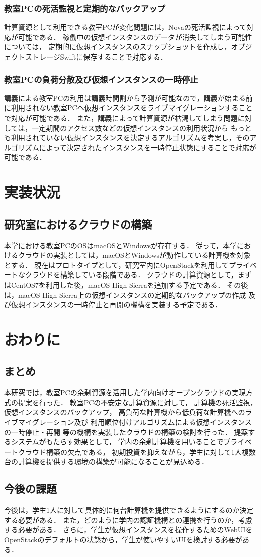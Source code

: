 \documentclass[10pt,a4paper]{jsarticle}
\begin{document}
\subsubsection{教室PCの死活監視と定期的なバックアップ}
計算資源として利用できる教室PCが変化問題には，Novaの死活監視によって対応が可能である．
稼働中の仮想インスタンスのデータが消失してしまう可能性については，
定期的に仮想インスタンスのスナップショットを作成し，オブジェクトストレージSwiftに保存することで対応する．
\subsubsection{教室PCの負荷分散及び仮想インスタンスの一時停止}
講義による教室PCの利用は講義時間割から予測が可能なので，講義が始まる前に利用されない教室PCへ仮想インスタンスをライブマイグレーションすることで対応が可能である．
また，講義によって計算資源が枯渇してしまう問題に対しては，一定期間のアクセス数などの仮想インスタンスの利用状況から
もっとも利用されていない仮想インスタンスを決定するアルゴリズムを考案し，そのアルゴリズムによって決定されたインスタンスを一時停止状態にすることで対応が可能である．

\section{実装状況}
\subsection{研究室におけるクラウドの構築}
本学における教室PCのOSはmacOSとWindowsが存在する．
従って，本学におけるクラウドの実装としては，macOSとWindowsが動作している計算機を対象とする．
現在はプロトタイプとして，研究室内にOpenStackを利用してプライベートなクラウドを構築している段階である．
クラウドの計算資源として，まずはCentOS7を利用した後，macOS High Sierraを追加する予定である．
その後は，macOS High Sierra上の仮想インスタンスの定期的なバックアップの作成
及び仮想インスタンスの一時停止と再開の機構を実装する予定である．

\section{おわりに}
\subsection{まとめ}
本研究では，教室PCの余剰資源を活用した学内向けオープンクラウドの実現方式の提案を行った．
教室PCの不安定な計算資源に対して，
計算機の死活監視，仮想インスタンスのバックアップ，
高負荷な計算機から低負荷な計算機へのライブマイグレーション及び
利用順位付けアルゴリズムによる仮想インスタンスの一時停止・再開
等の機構を実装したクラウドの構築の検討を行った．
提案するシステムがもたらす効果として，
学内の余剰計算機を用いることでプライベートクラウド構築の欠点である，
初期投資を抑えながら，学生に対して1人複数台の計算機を提供する環境の構築が可能になることが見込める．
\subsection{今後の課題}
今後は，学生1人に対して具体的に何台計算機を提供できるようにするのか決定する必要がある．
また，どのように学内の認証機構との連携を行うのか，考慮する必要がある．
さらに，学生が仮想インスタンスを操作するためのWebUIをOpenStackのデフォルトの状態から，学生が使いやすいUIを検討する必要がある．


\end{document}
